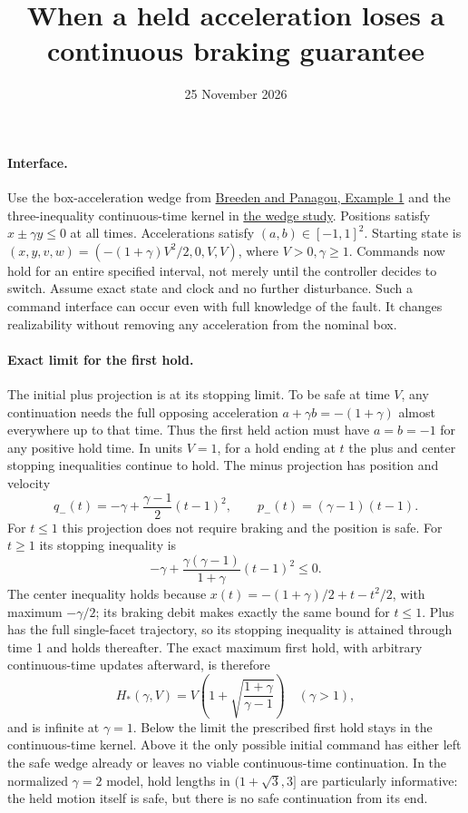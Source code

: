 \documentclass[11pt]{article}
\title{When a held acceleration loses a continuous braking guarantee}
\date{25 November 2026}
\begin{document}
\maketitle
\paragraph{Interface.}
Use the box-acceleration wedge from \href{https://public.websites.umich.edu/~dpanagou/assets/documents/JBreeden_ACC23.pdf}{Breeden and Panagou, Example 1} and the three-inequality continuous-time kernel in
\href{https://github.com/eternal-november/eos-research-programmes/pull/442}{the wedge study}. Positions satisfy \(x\pm\gamma y\leq0\) at all times. Accelerations satisfy \((a,b)\in[-1,1]^2\). Starting state is \((x,y,v,w)=(-(1+\gamma)V^2/2,0,V,V)\), where \(V>0,\gamma\geq1\). Commands now hold for an entire specified interval, not merely until the controller decides to switch. Assume exact state and clock and no further disturbance. Such a command interface can occur even with full knowledge of the fault. It changes realizability without removing any acceleration from the nominal box.
\paragraph{Exact limit for the first hold.}
The initial plus projection is at its stopping limit. To be safe at time \(V\), any continuation needs the full opposing acceleration \(a+\gamma b=-(1+\gamma)\) almost everywhere up to that time. Thus the first held action must have \(a=b=-1\) for any positive hold time. In units \(V=1\), for a hold ending at \(t\) the plus and center stopping inequalities continue to hold. The minus projection has position and velocity
\[
 q_-(t)=-\gamma+\frac{\gamma-1}{2}(t-1)^2,
 \qquad
 p_-(t)=(\gamma-1)(t-1).
\]
For \(t\leq1\) this projection does not require braking and the position is safe. For \(t\geq1\) its stopping inequality is
\[
 -\gamma+\frac{\gamma(\gamma-1)}{1+\gamma}(t-1)^2\leq 0.
\]
The center inequality holds because \(x(t)=-(1+\gamma)/2+t-t^2/2\), with maximum \(-\gamma/2\); its braking debit makes exactly the same bound for \(t\leq1\). Plus has the full single-facet trajectory, so its stopping inequality is attained through time 1 and holds thereafter. The exact maximum first hold, with arbitrary continuous-time updates afterward, is therefore
\[
 H_*(\gamma,V)=V\left(1+\sqrt{\frac{1+\gamma}{\gamma-1}}\right)
 \quad(\gamma>1),
\]
and is infinite at \(\gamma=1\). Below the limit the prescribed first hold stays in the continuous-time kernel. Above it the only possible initial command has either left the safe wedge already or leaves no viable continuous-time continuation. In the normalized \(\gamma=2\) model, hold lengths in \((1+\sqrt3,3]\) are particularly informative: the held motion itself is safe, but there is no safe continuation from its end.
\end{document}

